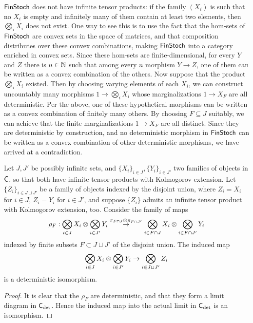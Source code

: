 \documentclass[11pt]{article}
\begin{document}
\begin{example}
	\label{infprods_finstoch}
	$\operatorname{\mathsf{FinStoch}}$ does not have infinite tensor products: if the family $(X_i)$ is such that no $X_i$ is empty and infinitely many of them contain at least two elements, then $\bigotimes_i X_i$ does not exist. One way to see this is to use the fact that the hom-sets of $\operatorname{\mathsf{FinStoch}}$ are convex sets in the space of matrices, and that composition distributes over these convex combinations, making $\operatorname{\mathsf{FinStoch}}$ into a category enriched in convex sets. Since these hom-sets are finite-dimensional, for every $Y$ and $Z$ there is $n \in \mathbb{N}$ such that among every $n$ morphism $Y \to Z$, one of them can be written as a convex combination of the others. Now suppose that the product $\bigotimes_i X_i$ existed. Then by choosing varying elements of each $X_i$, we can construct uncountably many morphisms $1 \to \bigotimes_i X_i$ whose marginalizations $1 \to X_F$ are all deterministic. Per the above, one of these hypothetical morphisms can be written as a convex combination of finitely many others. By choosing $F \subseteq J$ suitably, we can achieve that the finite marginalizations $1 \to X_F$ are all distinct. Since they are deterministic by construction, and no deterministic morphism in $\operatorname{\mathsf{FinStoch}}$ can be written as a convex combination of other deterministic morphisms, we have arrived at a contradiction.
\end{example}



\begin{lemma}
    Let $J,J'$ be possibly infinite sets, and $\{X_i\}_{i\in J}, \{Y_i\}_{i\in J'}$ two families of objects in $\mathsf{C}$, so that both have infinite tensor products with Kolmogorov extension.
    Let $\{Z_i\}_{i\in J \sqcup J'}$ be a family of objects indexed by the disjoint union, where $Z_i = X_i$ for $i\in J$, $Z_i = Y_i$ for $i \in J'$,
    and suppose $\{Z_i\}$ admits an infinite tensor product with Kolmogorov extension, too.
    Consider the family of maps
    \[\rho_F: \bigotimes_{i\in J}X_i \otimes \bigotimes_{i\in J'} Y_i \overset{\pi_{F \cap J} \otimes \pi_{F \cap J'}}{\to} \bigotimes_{i \in F \cap J}X_i \otimes \bigotimes_{i\in F \cap J'}Y_i\]
    indexed by finite subsets $F \subset J \sqcup J'$ of the disjoint union.
    The induced map
    \[\bigotimes_{i\in J}X_i \otimes \bigotimes_{i\in J'} Y_i \to \bigotimes_{i \in J \sqcup J'} Z_i\]
    is a deterministic isomorphism.
\end{lemma}
\begin{proof}
    It is clear that the $\rho_F$ are deterministic, and that they form a limit diagram in $\mathsf{C}_{\rm det}$.
    Hence the induced map into the actual limit in $\mathsf{C}_{\rm det}$ is an isomorphism.
\end{proof}
\end{document}
